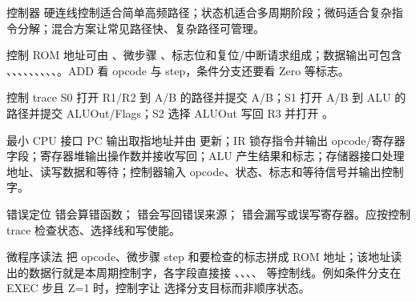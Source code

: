 \begin{chapteranswer}{控制器}
硬连线控制适合简单高频路径；状态机适合多周期阶段；微码适合复杂指令分解；混合方案让常见路径快、复杂路径可管理。
\end{chapteranswer}

\begin{chapteranswer}{控制 ROM}
地址可由 、微步骤 、标志位和复位/中断请求组成；数据输出可包含 、、、、、、、、、。ADD 看 opcode 与 step，条件分支还要看 Zero 等标志。
\end{chapteranswer}

\begin{chapteranswer}{控制 trace}
S0 打开 R1/R2 到 A/B 的路径并提交 A/B；S1 打开 A/B 到 ALU 的路径并提交 ALUOut/Flags；S2 选择 ALUOut 写回 R3 并打开 。
\end{chapteranswer}

\begin{chapteranswer}{最小 CPU 接口}
PC 输出取指地址并由  更新；IR 锁存指令并输出 opcode/寄存器字段；寄存器堆输出操作数并接收写回；ALU 产生结果和标志；存储器接口处理地址、读写数据和等待；控制器输入 opcode、状态、标志和等待信号并输出控制字。
\end{chapteranswer}

\begin{chapteranswer}{错误定位}
 错会算错函数； 错会写回错误来源； 错会漏写或误写寄存器。应按控制 trace 检查状态、选择线和写使能。
\end{chapteranswer}

\begin{chapteranswer}{微程序读法}
把 opcode、微步骤 step 和要检查的标志拼成 ROM 地址；该地址读出的数据行就是本周期控制字，各字段直接接 、、、、 等控制线。例如条件分支在 EXEC 步且 Z=1 时，控制字让  选择分支目标而非顺序状态。
\end{chapteranswer}
